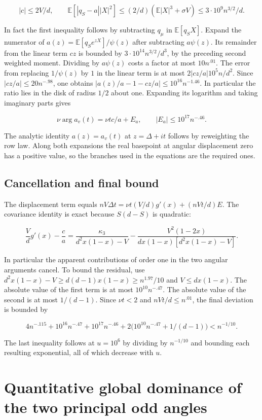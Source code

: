 \documentclass[11pt]{article}
\begin{document}
\[
|c|\le 2V/d,\qquad
\mathbb E[|q_S-a||X|^2]
\le (2/d)(\mathbb E|X|^3+\sigma V)
\le 3\cdot 10^9 n^{3/2}/d .
\]

In fact the first inequality follows by subtracting $q_\mu$ in
$\mathbb E[q_S X]$.
Expand the numerator of
$a(z)=\mathbb E[q_S e^{zX}]/\psi(z)$ after subtracting $a\psi(z)$.
Its remainder from the linear term $cz$ is bounded by
$3\cdot10^{14}n^{3/2}/d^3$, by the preceding second weighted moment.
Dividing by $a\psi(z)$ costs a factor at most $10n^{.01}$.
The error from replacing $1/\psi(z)$ by $1$ in the linear term is
at most $2|cz/a|10^5 n/d^2$. Since
$|cz/a|\le 20n^{-.98}$, one obtains
$|a(z)/a-1-cz/a|\le10^{16}n^{-1.46}$.
In particular the ratio lies in the disk of radius $1/2$ about
one. Expanding its logarithm and taking imaginary parts gives

\[
\nu\arg a_v(t)=\nu t c/a+E_a,\qquad |E_a|\le10^{17}n^{-.46}.
\]

The analytic identity $a(z)=a_v(t)$ at $z=\Delta+it$ follows
by reweighting the row law. Along both expansions the real
basepoint at angular displacement zero has a positive value,
so the branches used in the equations are the required ones.

\subsection{Cancellation and final bound}

The displacement term equals
$nV\Delta t=\nu t(V/d)g'(x)+(nVt/d)E$.
The covariance identity is exact because $S(d-S)$ is quadratic:

\[
\frac{V}{d}g'(x)-\frac ca
=\frac{\kappa_3}{d^2x(1-x)-V}
-\frac{V^2(1-2x)}{d x(1-x)[d^2x(1-x)-V]}.
\]

In particular the apparent contributions of order one in the two
angular arguments cancel. To bound the residual, use
$d^2x(1-x)-V\ge d(d-1)x(1-x)\ge n^{1.97}/10$
and $V\le d x(1-x)$.
The absolute value of the first term is at most $10^{10}n^{-.47}$.
The absolute value of the second is at most $1/(d-1)$.
Since $\nu t<2$ and $nVt/d\le n^{.01}$, the final deviation is
bounded by

\[
4n^{-.115}+10^{16}n^{-.47}+10^{17}n^{-.46}
+2\big(10^{10}n^{-.47}+1/(d-1)\big)<n^{-1/10}.
\]

The last inequality follows at $u=10^6$ by dividing by
$n^{-1/10}$ and bounding each resulting exponential, all of
which decrease with $u$.

\section{Quantitative global dominance of the two principal odd angles}
\end{document}
